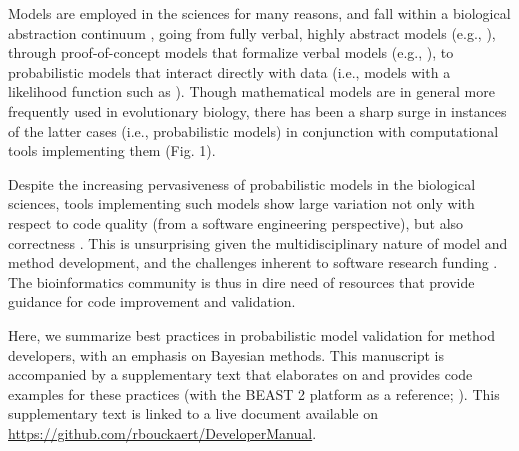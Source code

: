 \documentclass[oneside]{article}
\begin{document}
Models are employed in the sciences for many reasons, and fall within
a biological abstraction continuum \citep{servedio14}, going from
fully verbal, highly abstract models (e.g., \citealt{vanvalen73}),
through proof-of-concept models that formalize verbal models (e.g.,
\citealt{maynard78,reinhold99,mendes18}), to probabilistic models that
interact directly with data (i.e., models with a likelihood function
such as \citealt{yule24,felsenstein73,hky,hudson90}).
Though mathematical models are in general more frequently used in
evolutionary biology, there has been a sharp surge in instances of the
latter cases (i.e., probabilistic models) in conjunction with
computational tools implementing them (Fig. 1).

Despite the increasing pervasiveness of probabilistic models in the
biological sciences, tools implementing such models show large
variation not only with respect to code quality (from a software engineering
perspective), but also correctness \citep{darriba18}.
This is unsurprising given the multidisciplinary nature of model and method
development, and the challenges inherent to software research funding
\citep{siepel19}.
The bioinformatics community is thus in dire need of resources that
provide guidance for code improvement and validation.

Here, we summarize best practices in probabilistic model validation for method
developers, with an emphasis on Bayesian methods.
This manuscript is accompanied by a supplementary text that elaborates
on and provides code examples for these practices (with the BEAST 2
platform as a reference; \citealp{beast25}).
This supplementary text is linked to a live document available on
\href{https://github.com/rbouckaert/DeveloperManual}{https://github.com/rbouckaert/DeveloperManual}.


\end{document}
